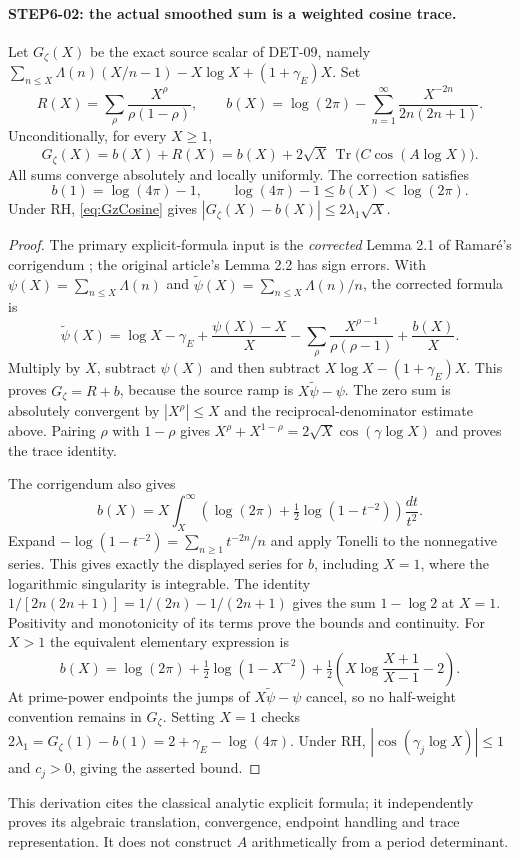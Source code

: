 \documentclass[11pt,a4paper]{article}
\newcommand{\Tr}{\operatorname{Tr}}
\newcommand{\fid}[1]{\textsf{#1}}
\begin{document}
\paragraph{STEP6-02: the actual smoothed sum is a weighted cosine trace.}
Let $G_\zeta(X)$ be the exact source scalar of \fid{DET-09}, namely
$\sum_{n\le X}\Lambda(n)(X/n-1)-X\log X+(1+\gamma_E)X$. Set
\[
 R(X)=\sum_\rho\frac{X^\rho}{\rho(1-\rho)},\qquad
 b(X)=\log(2\pi)-\sum_{n=1}^\infty\frac{X^{-2n}}{2n(2n+1)}.
\]
Unconditionally, for every $X\ge1$,
\begin{equation}\label{eq:GzCosine}
 G_\zeta(X)=b(X)+R(X)
 =b(X)+2\sqrt X\,\Tr\bigl(C\cos(A\log X)\bigr).
\end{equation}
All sums converge absolutely and locally uniformly. The correction satisfies
\[
 b(1)=\log(4\pi)-1,\qquad
 \log(4\pi)-1\le b(X)<\log(2\pi).
\]
Under RH, \eqref{eq:GzCosine} gives
$|G_\zeta(X)-b(X)|\le2\lambda_1\sqrt X$.
\begin{proof}
The primary explicit-formula input is the \emph{corrected} Lemma 2.1 of Ramar\'e's corrigendum \cite[pp.~1--2]{ramare}; the original article's Lemma 2.2 has sign errors. With $\psi(X)=\sum_{n\le X}\Lambda(n)$ and $\widetilde\psi(X)=\sum_{n\le X}\Lambda(n)/n$, the corrected formula is
\[
 \widetilde\psi(X)=\log X-\gamma_E+\frac{\psi(X)-X}{X}
 -\sum_\rho\frac{X^{\rho-1}}{\rho(\rho-1)}+\frac{b(X)}X.
\]
Multiply by $X$, subtract $\psi(X)$ and then subtract
$X\log X-(1+\gamma_E)X$. This proves $G_\zeta=R+b$, because the source ramp is $X\widetilde\psi-\psi$. The zero sum is absolutely convergent by $|X^\rho|\le X$ and the reciprocal-denominator estimate above. Pairing $\rho$ with $1-\rho$ gives
$X^\rho+X^{1-\rho}=2\sqrt X\cos(\gamma\log X)$ and proves the trace identity.

The corrigendum also gives
\[
 b(X)=X\int_X^\infty
 \left(\log(2\pi)+\tfrac12\log(1-t^{-2})\right)\frac{dt}{t^2}.
\]
Expand $-\log(1-t^{-2})=\sum_{n\ge1}t^{-2n}/n$ and apply Tonelli to the nonnegative series. This gives exactly the displayed series for $b$, including $X=1$, where the logarithmic singularity is integrable. The identity
$1/[2n(2n+1)]=1/(2n)-1/(2n+1)$ gives the sum $1-\log2$ at $X=1$. Positivity and monotonicity of its terms prove the bounds and continuity. For $X>1$ the equivalent elementary expression is
\[
 b(X)=\log(2\pi)+\tfrac12\log(1-X^{-2})
 +\tfrac12\left(X\log\frac{X+1}{X-1}-2\right).
\]
At prime-power endpoints the jumps of $X\widetilde\psi-\psi$ cancel, so no half-weight convention remains in $G_\zeta$. Setting $X=1$ checks
$2\lambda_1=G_\zeta(1)-b(1)=2+\gamma_E-\log(4\pi)$.
Under RH, $|\cos(\gamma_j\log X)|\le1$ and $c_j>0$, giving the asserted bound.
\end{proof}
This derivation cites the classical analytic explicit formula; it independently proves its algebraic translation, convergence, endpoint handling and trace representation. It does not construct $A$ arithmetically from a period determinant.
\end{document}
